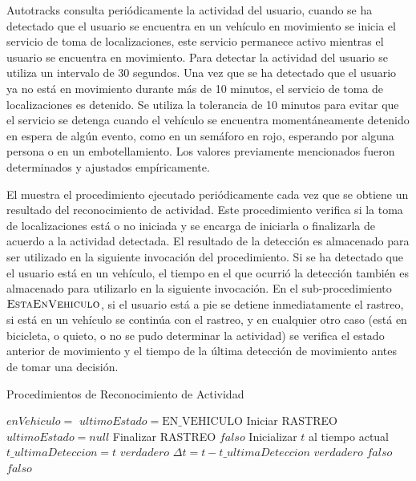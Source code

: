 Autotracks consulta periódicamente la actividad del usuario, cuando se ha detectado que el usuario se encuentra en un vehículo en movimiento se inicia el servicio de toma de localizaciones, este servicio permanece activo mientras el usuario se encuentra en movimiento. Para detectar la actividad del usuario se utiliza un intervalo de 30 segundos. Una vez que se ha detectado que el usuario ya no está en movimiento durante más de 10 minutos, el servicio de toma de localizaciones es detenido. Se utiliza la tolerancia de 10 minutos para evitar que el servicio se detenga cuando el vehículo se encuentra momentáneamente detenido en espera de algún evento, como en un semáforo en rojo, esperando por alguna persona o en un embotellamiento. Los valores previamente mencionados fueron determinados y ajustados empíricamente.

El  muestra el procedimiento ejecutado periódicamente cada vez que se obtiene un resultado del reconocimiento de actividad. Este procedimiento verifica si la toma de localizaciones está o no iniciada y se encarga de iniciarla o finalizarla de acuerdo a la actividad detectada. El resultado de la detección es almacenado para ser utilizado en la siguiente invocación del procedimiento. Si se ha detectado que el usuario está en un vehículo, el tiempo en el que ocurrió la detección también es almacenado para utilizarlo en la siguiente invocación. En el sub-procedimiento $\Call {EstaEnVehiculo}{}$, si el usuario está a pie se detiene inmediatamente el rastreo, si está en un vehículo se continúa con el rastreo, y en cualquier otro caso (está en bicicleta, o quieto, o no se pudo determinar la actividad) se verifica el estado anterior de movimiento y el tiempo de la última detección de movimiento antes de tomar una decisión.
 
\begin{algorithm}
\caption{Procedimientos de Reconocimiento de Actividad}
\label{alg:deteccion_actividad}
\begin{algorithmic}[1]
	\State $enVehiculo =$ 
		\State $ultimoEstado = \text{EN\_VEHICULO}$
			\State Iniciar RASTREO
		\EndIf
	\Else
		\State $ultimoEstado = null$
			\State Finalizar RASTREO
		\EndIf
	\EndIf
\EndProcedure
\Statex
{}
		\State \Return $falso$
	\Else
		\State Inicializar $t$ al tiempo actual
			\State $t\_ultimaDeteccion = t$ 
			\State \Return $verdadero$
		\Else
			\State $\Delta t = t - t\_ultimaDeteccion$
				\State \Return $verdadero$
			\Else
				\State \Return $falso$
			\EndIf
		\Else
			\State \Return $falso$
		\EndIf
		\EndIf
	\EndIf
\EndFunction
\end{algorithmic}
\end{algorithm}

